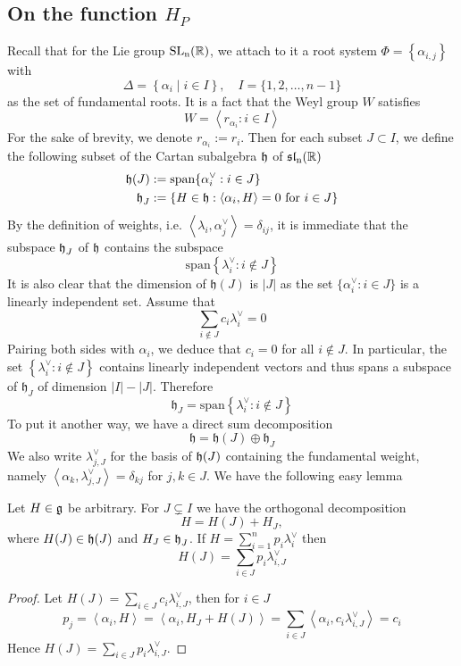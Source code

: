 \subsection{On the function $H_P$}
Recall that for the Lie group $\operatorname{\text{SL}_n(\mathbb{R})}$, we attach to it a root system $\Phi = \left\lbrace \alpha_{i,j}\right\rbrace$ with
\[\Delta = \left\lbrace \alpha_i\mid i \in I \right\rbrace, \quad I = \{1,2,\ldots,n-1\}\]
as the set of fundamental roots. It is a fact that the Weyl group $W$ satisfies
\[W = \left\langle r_{\alpha_i}: i \in I \right\rangle\]
For the sake of brevity, we denote $r_{\alpha_i}:=r_i$. Then for each subset $J \subset I$,
we define the following subset of the Cartan subalgebra $\operatorname{\mathfrak{h}}$ of $\operatorname{\mathfrak{sl}_n(\mathbb{R})}$
\begin{align*}
    \operatorname{\mathfrak{h}}(J) & :=\text{span}\{ \alpha^\vee_i: i \in J\}                                       \\
    \operatorname{\mathfrak{h}}_J  & := \{H \in \operatorname{\mathfrak{h}}: \left\langle \alpha_i,H\right\rangle=0 \mbox{ for } i \in J \}
\end{align*}
By the definition of weights, i.e. $\left\langle \lambda_i,\alpha^\vee_j \right\rangle = \delta_{ij}$, it is immediate
that the subspace $\operatorname{\mathfrak{h}}_J$ of $\operatorname{\mathfrak{h}}$ contains the subspace
\[\text{span}\left\lbrace \lambda^\vee_i: i \notin J\right\rbrace \]
It is also clear that the dimension of $\mathfrak{h}(J)$ is $|J|$ as the set $\{ \alpha^\vee_i: i \in J\}  $
is a linearly independent set. Assume that
\[\sum_{i \notin J}c_i\lambda_i^\vee =0\]
Pairing both sides with $\alpha_i$, we deduce that $c_i=0$ for all $i \notin J$. In particular, the set $\left\lbrace \lambda^\vee_i: i \notin J\right\rbrace $ contains linearly independent vectors and thus spans
a subspace of $\mathfrak{h}_J$ of dimension $|I|-|J|$. Therefore
\[\mathfrak{h}_J=\text{span}\left\lbrace \lambda^\vee_i: i \notin J\right\rbrace\]
To put it another way, we have a direct sum decomposition
\[\mathfrak{h} = \mathfrak{h}(J) \oplus \mathfrak{h}_J\]
We also write $\lambda^{\vee}_{j,J}$ for the basis of $\operatorname{\mathfrak{h}}(J)$ containing the fundamental
weight, namely $\left\langle \alpha_k,\lambda^{\vee}_{j,J}\right\rangle = \delta_{kj}$ for $j,k \in J$. We have
the following easy lemma
\begin{lemma}\label{coeff-H(J)}
    Let $H \in \operatorname{\mathfrak{g}}$ be arbitrary. For $J \subsetneq I$ we have the orthogonal decomposition
    \[H = H(J)+H_J,\]
    where $H(J) \in \operatorname{\mathfrak{h}}(J)$ and $H_J \in \operatorname{\mathfrak{h}}_J$. If $H = \sum_{i=1}^n p_i\lambda^\vee_i$ then
    \[H(J) = \sum_{i \in J} p_i \lambda^\vee_{i,J}\]
\end{lemma}
\begin{proof}
    Let $H(J) = \sum_{i \in J} c_i \lambda^\vee_{i,J}$, then for $i \in J$
    \[p_j = \left\langle \alpha_i,H \right\rangle =\left\langle \alpha_i,H_J+H(J) \right\rangle = \sum_{i \in J}\left\langle \alpha_i,  c_i \lambda^\vee_{i,J}\right\rangle=c_i \]
    Hence $H(J) = \sum_{i \in J} p_i \lambda^\vee_{i,J}$.
\end{proof}
